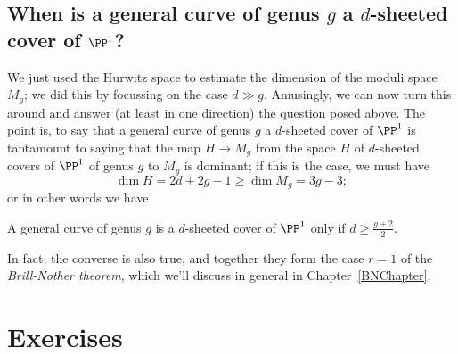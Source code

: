 \subsection{When is a general curve of genus $g$ a $d$-sheeted cover of $\PP^1$?}

We just used the Hurwitz space to estimate the dimension of the moduli space $M_g$; we did this by focussing on the case $d \gg  g$. Amusingly, we can now turn this around and answer (at least in one direction) the question posed above. The point is, to say that a general curve of genus $g$ a $d$-sheeted cover of $\PP^1$ is tantamount to saying that the map $H \to M_g$ from the space $H$ of $d$-sheeted covers of $\PP^1$ of genus $g$ to $M_g$ is dominant; if this is the case, we must have
$$
\dim H = 2d+2g-1 \geq \dim M_g = 3g-3;
$$
or in other words we have

\begin{corollary}\label{BN dim 1}
A general curve of genus $g$ is a $d$-sheeted cover of $\PP^1$ only if $d \geq \frac{g+2}{2}$.
\end{corollary}

In fact, the converse is also true, and together they form the case $r=1$ of the \emph{Brill-Nother theorem}, which we'll discuss in general in Chapter~\ref{BNChapter}. 

\section{Exercises}

% 


